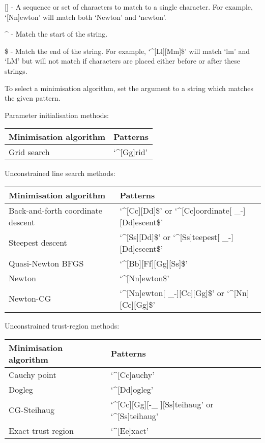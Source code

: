     [] - A sequence or set of characters to match to a single character.  For example,
    `[Nn]ewton' will match both `Newton' and `newton'.

    \^{} - Match the start of the string.

    \$ - Match the end of the string.  For example, `\^{}[Ll][Mm]\$' will match `lm' and `LM' but
    will not match if characters are placed either before or after these strings.

To select a minimisation algorithm, set the argument to a string which matches the given
pattern.


Parameter initialisation methods:


\begin{center}
\begin{tabular}{ll}
\toprule
Minimisation algorithm & Patterns \\
\midrule
 Grid search                        &  `\^{}[Gg]rid'                                           \\
\bottomrule
\end{tabular}
\end{center}


Unconstrained line search methods:


\begin{center}
\begin{tabular}{ll}
\toprule
Minimisation algorithm & Patterns \\
\midrule
 Back-and-forth coordinate descent  &  `\^{}[Cc][Dd]\$' or `\^{}[Cc]oordinate[ \_-][Dd]escent\$'     \\
 Steepest descent                   &  `\^{}[Ss][Dd]\$' or `\^{}[Ss]teepest[ \_-][Dd]escent\$'       \\
 Quasi-Newton BFGS                  &  `\^{}[Bb][Ff][Gg][Ss]\$'                                 \\
 Newton                             &  `\^{}[Nn]ewton\$'                                        \\
 Newton-CG                          &  `\^{}[Nn]ewton[ \_-][Cc][Gg]\$' or `\^{}[Nn][Cc][Gg]\$'       \\
\bottomrule
\end{tabular}
\end{center}


Unconstrained trust-region methods:


\begin{center}
\begin{tabular}{ll}
\toprule
Minimisation algorithm & Patterns \\
\midrule
 Cauchy point                       &  `\^{}[Cc]auchy'                                         \\
 Dogleg                             &  `\^{}[Dd]ogleg'                                         \\
 CG-Steihaug                        &  `\^{}[Cc][Gg][-\_ ][Ss]teihaug' or `\^{}[Ss]teihaug'        \\
 Exact trust region                 &  `\^{}[Ee]xact'                                          \\
\bottomrule
\end{tabular}
\end{center}


